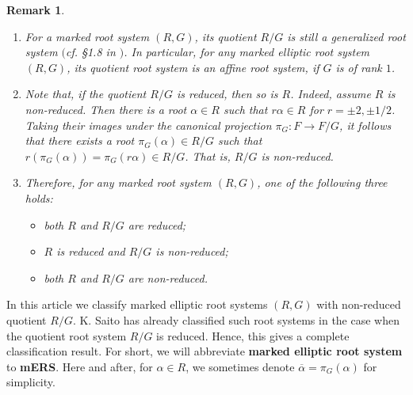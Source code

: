 \documentclass[11pt]{amsart}
\newtheorem{rem}[thm]{Remark}%
\begin{document}
\begin{rem}\label{rem_quot-root-sys} {\rm
\begin{enumerate}
\item
For a marked root system $(R,G)$, its quotient $R/G$ is still a generalized root 
system $($cf. \S 1.8 in \cite{Saito1985}$)$. In particular, for any  marked elliptic root 
system $(R,G)$, its quotient root system is an affine root system, if $G$ is of rank 
$1$. 
\item Note that, if the quotient $R/G$ is reduced, then so is $R$. Indeed, assume $R$ 
is non-reduced. Then there is a root 
$\alpha\in R$ such that $r\alpha\in R$ for $r=\pm 2,\pm1/2$.  Taking their
images under the canonical projection $\pi_G: F\to F/G$, it follows that
there exists a root $\pi_G(\alpha)\in R/G$ such that 
$r(\pi_G(\alpha))=\pi_G(r\alpha)\in R/G$. That is, $R/G$ is non-reduced. 
\item Therefore, for any marked root system $(R,G)$, one of the 
following three holds{\rm :} 
\begin{itemize}
\item[(i)] both $R$ and $R/G$ are reduced{\rm ;} 
\item[(ii)] $R$ is reduced and $R/G$ is non-reduced{\rm ;} 
\item[(iii)] both $R$ and $R/G$ are non-reduced.  
\end{itemize}
\end{enumerate} }
\end{rem}


In this article we classify marked elliptic root systems  
$(R,G)$ with non-reduced quotient $R/G$. K. Saito \cite{Saito1985} has already classified such root systems in the case 
when the quotient root system $R/G$ is reduced. 
Hence, this gives a complete classification result. For short, we will abbreviate \textbf{marked elliptic root system} to \textbf{mERS}. 
{Here and after, for $\alpha\in R$, 
we sometimes denote $\overline{\alpha}=\pi_G(\alpha)$ for simplicity.}
\\
\end{document}
